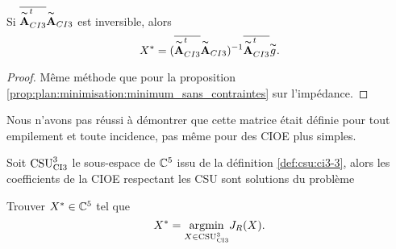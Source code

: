     \begin{prop}
      Si \(\conj{\tilde{\mA}_{CI3}^t}\tilde{\mA}_{CI3}\) est inversible, alors
      \begin{equation*}
        X^* = (\conj{\tilde{\mA}_{CI3}^t}\tilde{\mA}_{CI3})^{-1}\conj{\tilde{\mA}_{CI3}^t}\tilde{g}.
      \end{equation*}
    \end{prop}
    \begin{proof}
      Même méthode que pour la proposition \ref{prop:plan:minimisation:minimum_sans_contraintes} sur l'impédance.
    \end{proof}

    Nous n'avons pas réussi à démontrer que cette matrice était définie pour tout empilement et toute incidence, pas même pour des CIOE plus simples.

    \begin{thm}

      Soit \(\CSU[3]{CI3}\) le sous-espace de \(\CC^5\) issu de la définition \ref{def:csu:ci3-3}, alors les coefficients de la CIOE respectant les CSU sont solutions du problème

      Trouver \(X^* \in \CC^5\) tel que
      \begin{equation*}
        X^* = \argmin{X\in \CSU[3]{CI3}} J_R(X).
      \end{equation*}
    \end{thm}

    
